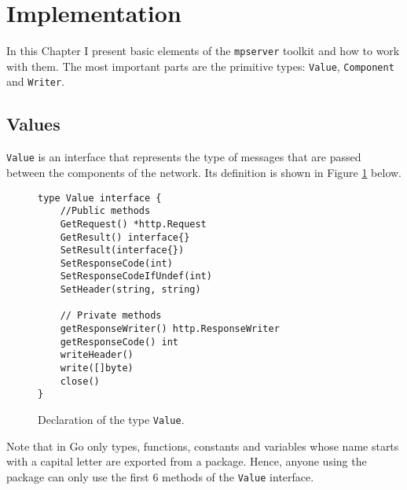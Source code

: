 \section{Implementation}
\label{sec:impl}
In this Chapter I present basic elements of the \texttt{mpserver} toolkit
and how to work with them. The most important parts are the primitive types:
\texttt{Value}, \texttt{Component} and \texttt{Writer}.

\subsection{Values}
\texttt{Value} is an interface that represents the type of messages that are
passed between the components of the network. Its definition is shown
in Figure \ref{fig:Value} below.

\begin{figure}[h]
\centering
\begin{lstlisting}
type Value interface {
    //Public methods
    GetRequest() *http.Request
    GetResult() interface{}
    SetResult(interface{})
    SetResponseCode(int)
    SetResponseCodeIfUndef(int)
    SetHeader(string, string)

    // Private methods
    getResponseWriter() http.ResponseWriter
    getResponseCode() int
    writeHeader()
    write([]byte)
    close()
}
\end{lstlisting}
\caption[scale=1.0]{Declaration of the type \texttt{Value}.}
\label{fig:Value}
\end{figure}

Note that in Go only types, functions, constants and variables whose name
starts with a capital letter are exported from a package. Hence, anyone
using the package can only use the first 6 methods of the \texttt{Value}
interface.


